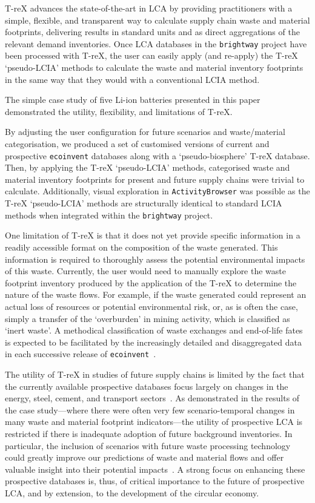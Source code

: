 \documentclass[a4paper,fleqn,longmktitle]{cas-dc}
\begin{document}
T-reX advances the state-of-the-art in LCA by providing practitioners with a simple, flexible, and transparent way to calculate supply chain waste and material footprints, delivering results in standard units and as direct aggregations of the relevant demand inventories. Once LCA databases in the \texttt{brightway} project have been processed with T-reX, the user can easily apply (and re-apply) the T-reX `pseudo-LCIA' methods to calculate the waste and material inventory footprints in the same way that they would with a conventional LCIA method.

The simple case study of five Li-ion batteries presented in this paper demonstrated the utility, flexibility, and limitations of T-reX.

By adjusting the user configuration for future scenarios and waste/material categorisation, we produced a set of customised versions of current and prospective \texttt{ecoinvent} databases along with a `pseudo-biosphere' T-reX database. Then, by applying the T-reX `pseudo-LCIA' methods, categorised waste and material inventory footprints for present and future supply chains were trivial to calculate. Additionally, visual exploration in \texttt{ActivityBrowser} was possible as the T-reX `pseudo-LCIA' methods are structurally identical to standard LCIA methods when integrated within the \texttt{brightway} project.

One limitation of T-reX is that it does not yet provide specific information in a readily accessible format on the composition of the waste generated. This information is required to thoroughly assess the potential environmental impacts of this waste. Currently, the user would need to manually explore the waste footprint inventory produced by the application of the T-reX to determine the nature of the waste flows. For example, if the waste generated could represent an actual loss of resources or  potential environmental risk, or, as is often the case, simply a transfer of the `overburden' in mining activity, which is classified as `inert waste'. A methodical classification of waste exchanges and end-of-life fates is expected to be facilitated by the increasingly detailed and disaggregated data in each successive release of \texttt{ecoinvent}~\citep{fitzgerald2023ecoinventdocumentation}.

The utility of T-reX in studies of future supply chains is limited by the fact that the currently available prospective databases focus largely on changes in the energy, steel, cement, and transport sectors~\citep{sacchi2023premisedocs}. As demonstrated in the results of the case study---where there were often very few scenario-temporal changes in many waste and material footprint indicators---the utility of prospective LCA is restricted if there is inadequate adoption of future background inventories. In particular, the inclusion of scenarios with future waste processing technology could greatly improve our predictions of waste and material flows and offer valuable insight into their potential impacts~\citep{bisinella2024wastelca}. A strong focus on enhancing these prospective databases is, thus, of critical importance to the future of prospective LCA, and by extension, to the development of the circular economy.
\end{document}
